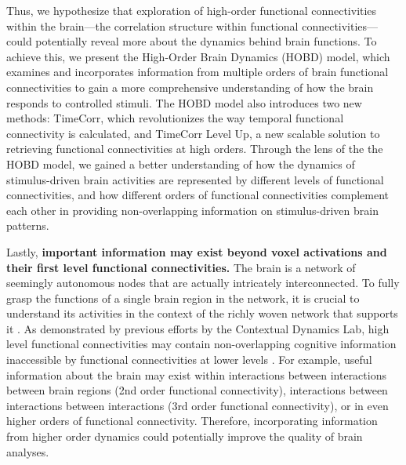 \documentclass[11pt]{article}
\begin{document}
\begin{enumerate}
Thus, we hypothesize that exploration of high-order functional connectivities within the brain---the correlation structure within functional connectivities---could potentially reveal more about the dynamics behind brain functions. To achieve this, we present the High-Order Brain Dynamics (HOBD) model, which examines and incorporates information from multiple orders of brain functional connectivities to gain a more comprehensive understanding of how the brain responds to controlled stimuli. The HOBD model also introduces two new methods: TimeCorr, which revolutionizes the way temporal functional connectivity is calculated, and TimeCorr Level Up, a new scalable solution to retrieving functional connectivities at high orders. Through the lens of the the HOBD model, we gained a better understanding of how the dynamics of stimulus-driven brain activities are represented by different levels of functional connectivities, and how different orders of functional connectivities complement each other in providing non-overlapping information on stimulus-driven brain patterns.

Lastly, \textbf{important information may exist beyond voxel activations and their first level functional connectivities.} The brain is a network of seemingly autonomous nodes that are actually intricately interconnected. To fully grasp the functions of a single brain region in the network, it is crucial to understand its activities in the context of the richly woven network that supports it \citep{Battiston2017}. As demonstrated by previous efforts by the Contextual Dynamics Lab, high level functional connectivities may contain non-overlapping cognitive information inaccessible by functional connectivities at lower levels \citep{jeremy2017}. For example, useful information about the brain may exist within interactions between interactions between brain regions (2nd order functional connectivity), interactions between interactions between interactions (3rd order functional connectivity), or in even higher orders of functional connectivity. Therefore, incorporating information from higher order dynamics could potentially improve the quality of brain analyses.


\end{enumerate}
\end{document}
